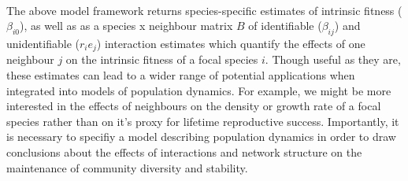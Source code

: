 \documentclass[a4,12pt]{article}
\begin{document}
        \paragraph{}
        The above model framework returns species-specific estimates of intrinsic fitness ($\beta_{i0}$), as well as as a species x neighbour matrix $B$ of identifiable ($\beta_{ij}$) and unidentifiable ($r_i e_j$) interaction estimates which quantify the effects of one neighbour $j$ on the intrinsic fitness of a focal species $i$. Though useful as they are, these estimates can lead to a wider range of potential applications when integrated into models of population dynamics. For example, we might be more interested in the effects of neighbours on the density or growth rate of a focal species rather than on it's proxy for lifetime reproductive success. Importantly, it is necessary to specifiy a model describing population dynamics in order to draw conclusions about the effects of interactions and network structure on the maintenance of community diversity and stability. 
\end{document}
